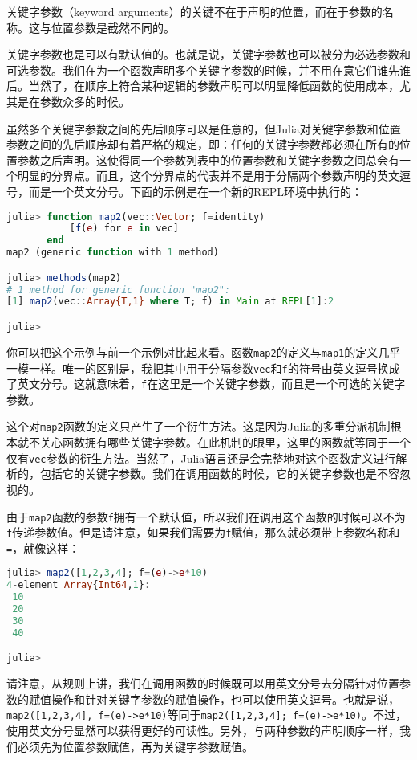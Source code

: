 关键字参数（keyword arguments）的关键不在于声明的位置，而在于参数的名称。这与位置参数是截然不同的。

关键字参数也是可以有默认值的。也就是说，关键字参数也可以被分为必选参数和可选参数。我们在为一个函数声明多个关键字参数的时候，并不用在意它们谁先谁后。当然了，在顺序上符合某种逻辑的参数声明可以明显降低函数的使用成本，尤其是在参数众多的时候。

虽然多个关键字参数之间的先后顺序可以是任意的，但Julia对关键字参数和位置参数之间的先后顺序却有着严格的规定，即：任何的关键字参数都必须在所有的位置参数之后声明。这使得同一个参数列表中的位置参数和关键字参数之间总会有一个明显的分界点。而且，这个分界点的代表并不是用于分隔两个参数声明的英文逗号，而是一个英文分号。下面的示例是在一个新的REPL环境中执行的：

\begin{lstlisting}[language=julia]
julia> function map2(vec::Vector; f=identity)
           [f(e) for e in vec]
       end
map2 (generic function with 1 method)

julia> methods(map2)
# 1 method for generic function "map2":
[1] map2(vec::Array{T,1} where T; f) in Main at REPL[1]:2

julia> 
\end{lstlisting}

你可以把这个示例与前一个示例对比起来看。函数\verb|map2|的定义与\verb|map1|的定义几乎一模一样。唯一的区别是，我把其中用于分隔参数\verb|vec|和\verb|f|的符号由英文逗号换成了英文分号。这就意味着，\verb|f|在这里是一个关键字参数，而且是一个可选的关键字参数。

这个对\verb|map2|函数的定义只产生了一个衍生方法。这是因为Julia的多重分派机制根本就不关心函数拥有哪些关键字参数。在此机制的眼里，这里的函数就等同于一个仅有\verb|vec|参数的衍生方法。当然了，Julia语言还是会完整地对这个函数定义进行解析的，包括它的关键字参数。我们在调用函数的时候，它的关键字参数也是不容忽视的。

由于\verb|map2|函数的参数\verb|f|拥有一个默认值，所以我们在调用这个函数的时候可以不为\verb|f|传递参数值。但是请注意，如果我们需要为\verb|f|赋值，那么就必须带上参数名称和\verb|=|，就像这样：

\begin{lstlisting}[language=julia]
julia> map2([1,2,3,4]; f=(e)->e*10)
4-element Array{Int64,1}:
 10
 20
 30
 40

julia>
\end{lstlisting}

请注意，从规则上讲，我们在调用函数的时候既可以用英文分号去分隔针对位置参数的赋值操作和针对关键字参数的赋值操作，也可以使用英文逗号。也就是说，\verb|map2([1,2,3,4], f=(e)->e*10)|等同于\verb|map2([1,2,3,4]; f=(e)->e*10)|。不过，使用英文分号显然可以获得更好的可读性。另外，与两种参数的声明顺序一样，我们必须先为位置参数赋值，再为关键字参数赋值。

